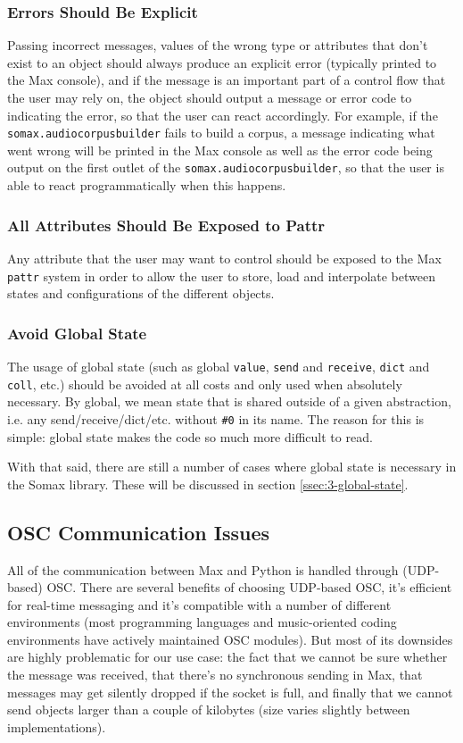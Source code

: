 \subsubsection{Errors Should Be Explicit}
Passing incorrect messages, values of the wrong type or attributes that don't exist to an object should always produce an explicit error (typically printed to the Max console), and if the message is an important part of a control flow that the user may rely on, the object should output a message or error code to indicating the error, so that the user can react accordingly. For example, if the \texttt{somax.audiocorpusbuilder} fails to build a corpus, a message indicating what went wrong will be printed in the Max console as well as the error code being output on the first outlet of the \texttt{somax.audiocorpusbuilder}, so that the user is able to react programmatically when this happens.


\subsubsection{All Attributes Should Be Exposed to Pattr}
Any attribute that the user may want to control should be exposed to the Max \texttt{pattr} system in order to allow the user to store, load and interpolate between states and configurations of the different objects.

\subsubsection{Avoid Global State}
The usage of global state (such as global \texttt{value}, \texttt{send} and \texttt{receive}, \texttt{dict} and \texttt{coll}, etc.) should be avoided at all costs and only used when absolutely necessary. By global, we mean state that is shared outside of a given abstraction, i.e. any send/receive/dict/etc. without \texttt{\#0} in its name. The reason for this is simple: global state makes the code so much more difficult to read. 

With that said, there are still a number of cases where global state is necessary in the Somax library. These will be discussed in section \ref{ssec:3-global-state}.


\subsection{OSC Communication Issues}\label{ssec:3-osc-issues}
All of the communication between Max and Python is handled through (UDP-based) OSC. There are several benefits of choosing UDP-based OSC, it's efficient for real-time messaging and it's compatible with a number of different environments (most programming languages and music-oriented coding environments have actively maintained OSC modules). But most of its downsides are highly problematic for our use case: the fact that we cannot be sure whether the message was received, that there's no synchronous sending in Max, that messages may get silently dropped if the socket is full, and finally that we cannot send objects larger than a couple of kilobytes (size varies slightly between implementations).

